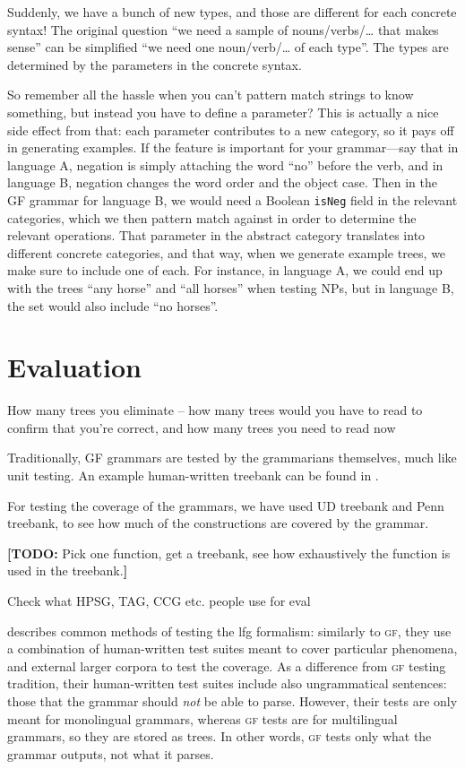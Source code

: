 \documentclass[11pt]{article}
\def\gf{\textsc{gf}}
\newcommand{\todo}[1]{{\color{cyan}\textbf{[TODO: }#1\textbf{]}}}
\begin{document}
Suddenly, we have a bunch of new types, and those are different for
each concrete syntax! The original question ``we need a sample of
nouns/verbs/… that makes sense'' can be simplified ``we need one
noun/verb/… of each type''. The types are determined by the parameters
in the concrete syntax. 

So remember all the hassle when you can't pattern match strings to
know something, but instead you have to define a parameter? This is
actually a nice side effect from that: each parameter contributes to a
new category, so it pays off in generating examples. If the feature is
important for your grammar---say that in language A, negation is
simply attaching the word  ``no'' before the verb, and in language B,
negation changes the word order and the object case. Then in the GF
grammar for language B, we would need a Boolean \texttt{isNeg} field
in the relevant categories, which we then pattern match against in
order to determine the relevant operations. That parameter in the
abstract category translates into different concrete categories, and
that way, when we generate example trees, we make sure to include one
of each. For instance, in language A, we could end up with the trees
``any horse'' and ``all horses'' when testing NPs, but in language B,
the set would also include ``no horses''. 


\section{Evaluation}

How many trees you eliminate -- how many trees would you have to read
to confirm that you're correct, and how many trees you need to read
now

Traditionally, GF grammars are tested by the grammarians themselves,
much like unit testing. An example human-written treebank can be found
in \cite[p.~136--142]{khegai2006phd}.

For testing the coverage of the grammars, we have used UD treebank
\cite{nivre2016ud} and Penn treebank, to see how much of the
constructions are covered by the grammar.

\todo{Pick one function, get a treebank, see how exhaustively the function
is used in the treebank.}

Check what HPSG, TAG, CCG etc. people use for eval

\cite[pp.~212--213]{butt1999lfg} describes common methods of testing the
{\sc lfg} formalism: similarly to \gf, they use a combination of
human-written test suites meant to cover particular phenomena, and
external larger corpora to test the coverage. As a difference from \gf{}
testing tradition, their human-written test suites include also
ungrammatical sentences: those that the grammar should \emph{not} be
able to parse. However, their tests are only meant for monolingual
grammars, whereas \gf{} tests are for multilingual grammars, so they are
stored as trees. In other words, \gf{} tests only what the grammar
outputs, not what it parses.
\end{document}

